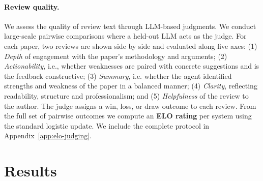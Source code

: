 \documentclass{article} %
\newcommand{\shrink}[1][0.5]{\vspace{-#1\baselineskip}}
\begin{document}
\paragraph{Review quality.} \shrink[.75] 
We assess the quality of review text through LLM-based judgments. 
We conduct large-scale pairwise comparisons where a held-out LLM acts as the judge. For each paper, two reviews are shown side by side and evaluated along five axes:
(1) \emph{Depth} of engagement with the paper’s methodology and arguments; (2) \emph{Actionability}, i.e., whether weaknesses are paired with concrete suggestions and is the feedback constructive; (3) \emph{Summary}, i.e. whether the agent identified strengths and weakness of the paper in a balanced manner; (4) \emph{Clarity}, reflecting readability, structure and professionalism; and (5) \emph{Helpfulness} of the review to the author. The judge assigns a win, loss, or draw outcome to each review. 
From the full set of pairwise outcomes we compute an \textbf{ELO rating} per system using the standard logistic update.
We include the complete protocol in Appendix~\ref{app:elo-judging}.

\section{Results}
\end{document}
